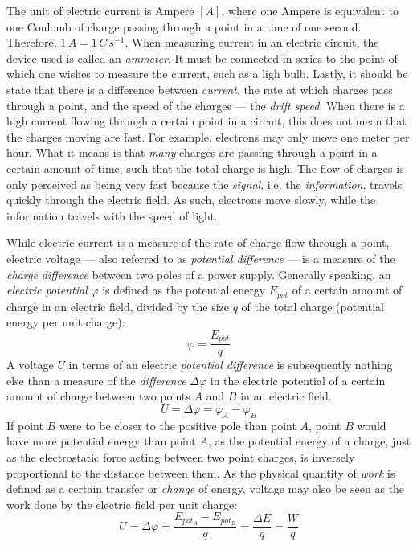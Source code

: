 The unit of electric current is Ampere $[A]$, where one Ampere is equivalent to one Coulomb of charge passing through a point in a time of one second. Therefore, $1\, A = 1\, C\, s^{-1}$. When measuring current in an electric circuit, the device used is called an \emph{ammeter}. It must be connected in series to the point of which one wishes to measure the current, such as a ligh bulb. Lastly, it should be state that there is a difference between \emph{current}, the rate at which charges pass through a point, and the speed of the charges --- the \emph{drift speed}. When there is a high current flowing through a certain point in a circuit, this does not mean that the charges moving are fast. For example, electrons may only move one meter per hour. What it means is that \emph{many} charges are passing through a point in a certain amount of time, such that the total charge is high. The flow of charges is only perceived as being very fast because the \emph{signal}, i.e. the \emph{information}, travels quickly through the electric field. As such, electrons move slowly, while the information travels with the speed of light.


While electric current is a measure of the rate of charge flow through a point, electric voltage --- also referred to as \emph{potential difference} --- is a measure of the \emph{charge difference} between two poles of a power supply. Generally speaking, an \emph{electric potential} $\varphi$ is defined as the potential energy $E_{pot}$ of a certain amount of charge in an electric field, divided by the size $q$ of the total charge (potential energy per unit charge): $$\varphi = \frac{E_{pot}}{q}$$ A voltage $U$ in terms of an electric \emph{potential difference} is subsequently nothing else than a measure of the \emph{difference} $\Delta \varphi$ in the electric potential of a certain amount of charge between two points $A$ and $B$ in an electric field. $$U = \Delta \varphi = \varphi_A - \varphi_B$$ If point $B$ were to be closer to the positive pole than point $A$, point $B$ would have more potential energy than point $A$, as the potential energy of a charge, just as the electrostatic force acting between two point charges, is inversely proportional to the distance between them. As the physical quantity of \emph{work} is defined as a certain transfer or \emph{change} of energy, voltage may also be seen as the work done by the electric field per unit charge: $$U = \Delta \varphi = \frac{E_{pot_A} - E_{pot_B}}{q} = \frac{\Delta E}{q} = \frac{W}{q}$$

